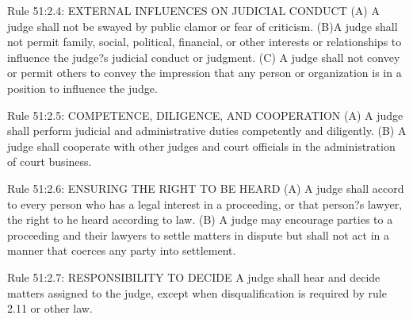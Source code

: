 \documentclass[12pt,\documentclassflag]{complaint}
\begin{document}
\begin{enumerate}
Rule 51:2.4: EXTERNAL INFLUENCES ON JUDICIAL CONDUCT
(A) A judge shall not be swayed by public clamor or fear of criticism.
(B)A judge shall not permit family, social, political, financial, or other interests or relationships to influence the judge?s judicial conduct or judgment.
(C) A judge shall not convey or permit others to convey the impression that any person or organization is in a position to influence the judge.


Rule 51:2.5: COMPETENCE, DILIGENCE, AND COOPERATION
(A) A judge shall perform judicial and administrative duties competently and diligently.
(B) A judge shall cooperate with other judges and court officials in the administration of court business.


Rule 51:2.6: ENSURING THE RIGHT TO BE HEARD
(A) A judge shall accord to every person who has a legal interest in a proceeding, or that person?s lawyer, the right to he heard according to law.
(B) A judge may encourage parties to a proceeding and their lawyers to settle matters in dispute but shall not act in a manner that coerces any party into settlement.


Rule 51:2.7: RESPONSIBILITY TO DECIDE
A judge shall hear and decide matters assigned to the judge, except when disqualification is required by rule 2.11 or other law.



\end{enumerate}
\end{document}
